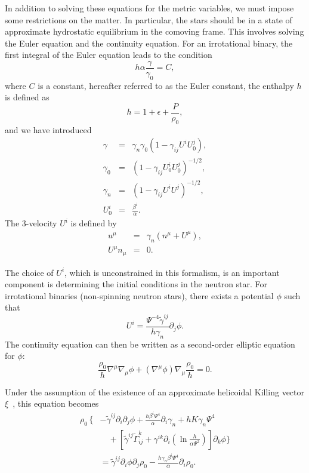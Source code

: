 {In addition to solving these equations for the metric variables, we
must impose some restrictions on the matter. In particular, the stars
should be in a state of approximate hydrostatic equilibrium in the comoving
frame. 
This involves solving the Euler equation and the continuity
equation. For an irrotational binary, the first integral of the Euler
equation leads to the condition
\begin{equation}
h\alpha\frac{\gamma}{\gamma_0} = C,
\label{eq:Euler0}
\end{equation}
where $C$ is a constant, hereafter referred to as the Euler constant, the enthalpy $h$ is defined as
\begin{equation}
h = 1+\epsilon + \frac{P}{\rho_0},
\end{equation}
and we have introduced
\begin{eqnarray}
\gamma &=& \gamma_n\gamma_0\left(1 -
\gamma_{ij}U^iU^j_0\right),\\ \gamma_0 &=& \left(1 -
\gamma_{ij}U^i_0U^j_0\right)^{-1/2},\\ \gamma_n &=& \left(1 -
\gamma_{ij}U^iU^j\right)^{-1/2},\\ U^i_0 &=& \frac{\beta^{i}}{\alpha}.
\end{eqnarray}
The 3-velocity $U^i$ is defined by
\begin{eqnarray}
u^{\mu} &=& \gamma_n (n^\mu + U^\mu),\\ U^\mu n_\mu &=& 0.
\end{eqnarray}

The choice of $U^i$, which is unconstrained in this formalism, is an
important component is determining the initial conditions in the
neutron star. For irrotational binaries (non-spinning neutron stars),
there exists a potential $\phi$ such that
\begin{equation}
U^i = \frac{\Psi^{-4}\tilde{\gamma}^{ij}}{h\gamma_n}\partial_j\phi.
\end{equation}
The continuity equation can then be written as a second-order elliptic
equation for $\phi$:
\begin{equation}
\label{eq:Continuity}
\frac{\rho_0}{h}\nabla^{\mu}\nabla_{\mu}\phi +
\left(\nabla^{\mu}\phi\right)\nabla_{\mu}\frac{\rho_0}{h}=0.
\end{equation}

Under the assumption of the existence of an approximate helicoidal Killing vector $\xi$~\cite{Teukolsky:1998sh,Shibata:1998um}, this equation becomes
\begin{align}
\rho_0\,\bigg\{\!\!&-\tilde{\gamma}^{ij}\partial_i\partial_j\phi + 
\frac{h\beta^{i}\Psi^4}{\alpha}\partial_i\gamma_n+hK\gamma_n\Psi^4
\nonumber \\
&\quad+\left[\tilde{\gamma}^{ij}\tilde{\Gamma}^k_{ij}+\gamma^{ik}\partial_i\left(\ln\frac{h}{\alpha\Psi^2}\right)\right]\partial_k\phi 
\bigg\} \nonumber \\
&=
\tilde{\gamma}^{ij}\partial_i\phi\partial_j\rho_0-\frac{h\gamma_n\beta^i\Psi^4}{\alpha}\partial_i\rho_0. 
\label{eq:Continuity0}
\end{align}

}
